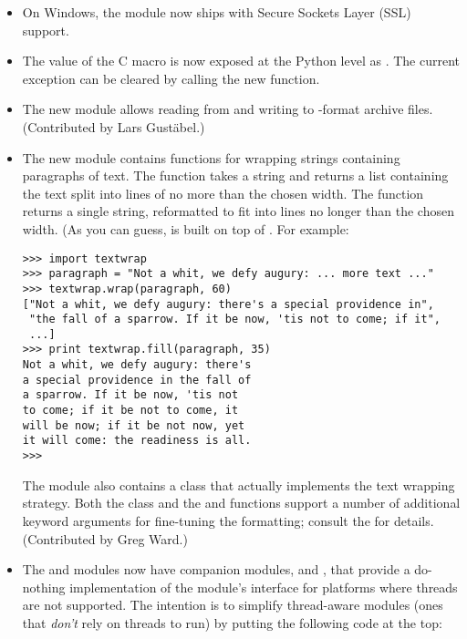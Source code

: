 \documentclass{howto}
\begin{document}
\begin{itemize}
\item On Windows, the  module now ships with Secure 
Sockets Layer (SSL) support.

\item The value of the C  macro is now
exposed at the Python level as .  The current
exception can be cleared by calling the new 
function.

\item The new  module 
allows reading from and writing to -format archive files.
(Contributed by Lars Gust\"abel.)

\item The new  module contains functions for wrapping
strings containing paragraphs of text.  The  function takes a string and returns a list containing
the text split into lines of no more than the chosen width.  The
 function returns a single
string, reformatted to fit into lines no longer than the chosen width.
(As you can guess,  is built on top of
.  For example:

\begin{verbatim}
>>> import textwrap
>>> paragraph = "Not a whit, we defy augury: ... more text ..."
>>> textwrap.wrap(paragraph, 60)
["Not a whit, we defy augury: there's a special providence in",
 "the fall of a sparrow. If it be now, 'tis not to come; if it",
 ...]
>>> print textwrap.fill(paragraph, 35)
Not a whit, we defy augury: there's
a special providence in the fall of
a sparrow. If it be now, 'tis not
to come; if it be not to come, it
will be now; if it be not now, yet
it will come: the readiness is all.
>>>
\end{verbatim}

The module also contains a  class that actually
implements the text wrapping strategy.   Both the
 class and the  and
 functions support a number of additional keyword
arguments for fine-tuning the formatting; consult the  for details.
(Contributed by Greg Ward.)

\item The  and  modules now have
companion modules,  and ,
that provide a do-nothing implementation of the 
module's interface for platforms where threads are not supported.  The
intention is to simplify thread-aware modules (ones that \emph{don't}
rely on threads to run) by putting the following code at the top:


\end{itemize}
\end{document}
